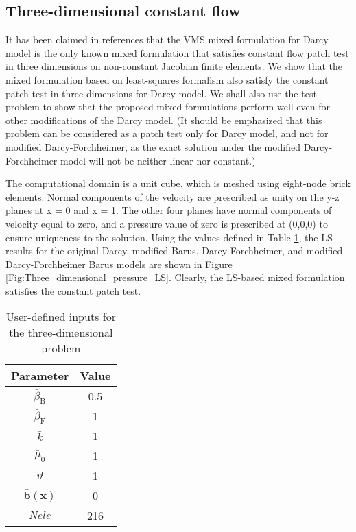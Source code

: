 \documentclass[11pt,reqno]{amsart}
\begin{document}
\subsection{Three-dimensional constant flow}
It has been claimed in references 
\cite{Nakshatrala_Turner_Hjelmstad_Masud_CMAME_2006_v195_p4036,
Hughes_Masud_Wan_CMAME_2006_v195_p3347} that the VMS mixed 
formulation for Darcy model is the only known mixed 
formulation that satisfies constant flow patch test 
in three dimensions on non-constant Jacobian finite 
elements. 
We show that the mixed formulation based on least-squares 
formalism also satisfy the constant patch test in three 
dimensions for Darcy model. We shall also use the test 
problem to show that the proposed mixed formulations 
perform well even for other modifications of the Darcy 
model. (It should be emphasized that this problem can 
be considered as a patch test only for Darcy model, 
and not for modified Darcy-Forchheimer, as the 
exact solution under the modified Darcy-Forchheimer 
model will not be neither linear nor constant.)  

The computational domain is a unit cube, which is meshed 
using eight-node brick elements. Normal components of the 
velocity are prescribed as unity on the y-z planes at x = 
0 and x = 1. The other four planes have normal components 
of velocity equal to zero, and a pressure value of zero 
is prescribed at (0,0,0) to ensure uniqueness to the 
solution. Using the values defined in Table 
\ref{Tab:three_dimensional}, the LS results for the 
original Darcy, modified Barus, Darcy-Forchheimer, 
and modified Darcy-Forchheimer Barus models are shown 
in Figure \ref{Fig:Three_dimensional_pressure_LS}. 
Clearly, the LS-based mixed formulation satisfies 
the constant patch test. 

\begin{table}[b!]
  \centering
  \caption{User-defined inputs for the three-dimensional problem}
  \begin{tabular}{cc}
    \hline
    Parameter & Value \\ \hline
    $\bar{\beta}_{\mathrm{B}}$ & 0.5\\
    $\bar{\beta}_{\mathrm{F}}$ & 1\\	
    $\bar{k}$ & 1\\
    $\bar{\mu}_0$ & 1\\
    $\vartheta$ & 1 \\
    $\bar{\mathbf{b}}(\mathbf{x})$ & 0 \\
    $Nele$ & 216\\
    \hline
  \end{tabular}
  \label{Tab:three_dimensional}
\end{table}
\end{document}
